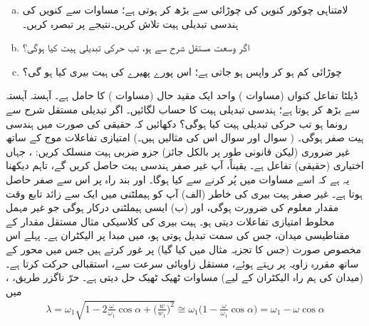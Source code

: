 \begin{enumerate}[a.]
\item
لامتناہی چوکور کنویں کی چوڑائی  سے بڑھ کر  ہوتی ہے؛ مساوات  سے کنویں کی ہندسی تبدیلی ہیت تلاش کریں۔نتیجے پر تبصرہ کریں۔
\item
اگر وسعت مستقل شرح  سے ہو، تب حرکی تبدیلی ہیت کیا ہوگی؟ 
\item
چوڑائی کم ہو کر واپس  ہو جاتی ہے؛ اس پورے پھیرے کی ہیت بیری کیا ہو گی؟ 
\end{enumerate}
ڈیلٹا تفاعل کنواں (مساوات ) واحد ایک مقید حال (مساوات ) کا حامل ہے۔  آہستہ آہستہ  سے بڑھ کر  ہوتا ہے؛ ہندسی تبدیلی ہیت کا حساب لگائیں۔ اگر تبدیلی مستقل شرح  سے رونما ہو تب حرکی تبدیلی ہیت کیا ہوگی؟
دکھائیں کہ حقیقی  کی صورت میں ہندسی ہیت صفر ہوگی۔ ( سوال  اور سوال  اس کی مثالیں ہیں۔) امتیازی تفاعلات موج کے ساتھ غیر ضروری (لیکن قانونی طور پر بالکل جائز) جزو ضربی ہیت منسلک کریں: ، جہاں  اختیاری (حقیقی) تفاعل ہے۔ یقیناً، آپ غیر صفر ہندسی ہیت حاصل کریں گے، تاہم دیکھنا یہ ہے کہ اسے مساوات  میں پُر کرنے سے کیا ہوگا۔ اور بند راہ پر اس سے صفر حاصل ہوتا ہے۔  غیر صفر ہیت بیری کی خاطر (الف) آپ کو ہیملٹنی میں ایک سے زائد تابع وقت مقدار معلوم کی ضرورت ہوگی، اور (ب) ایسی ہیملٹنی درکار ہوگی جو غیر مہمل مخلوط امتیازی تفاعلات دیتی ہو۔ 
ہیت بیری کی کلاسیکی مثال مستقل مقدار کے مقناطیسی میدان، جس کی سمت تبدیل ہوتی ہو، میں مبدا پر الیکٹران ہے۔ پہلے اس مخصوص صورت (جس کا تجزیہ مثال  میں کیا گیا) پر غور کرتے ہیں جس میں محور  کے ساتھ مقررہ زاویہ  پر رہتے ہوئے، مستقل زاویائی سرعت  سے،  استقبالی حرکت کرتا ہے۔ (میدان  کی ہم راہ  الیکٹران کے لیے) مساوات  ٹھیک ٹھیک حل دیتی ہے۔ حرّ ناگزر طریق، ، میں 
\begin{align}
\lambda = \omega_1 \sqrt{1 - 2 \frac{\omega}{\omega_1} \cos \alpha + \big ( \frac{w}{w_1} \big )^2 } \cong \omega_1 \big ( 1 - \frac{\omega}{\omega_1} \cos \alpha \big ) = \omega_1 - \omega \cos \alpha
\end{align}
